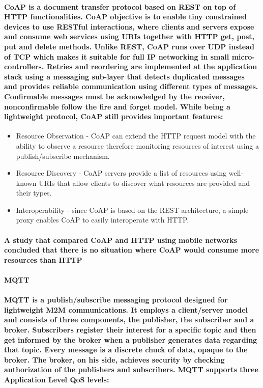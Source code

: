 \paragraph{
	\ac{CoAP} is a document transfer protocol based on \ac{REST} on top of \ac{HTTP} functionalities. \ac{CoAP} objective is to enable tiny constrained devices to use RESTful interactions, where clients and servers expose and consume web services using \ac{URIs} together with  \ac{HTTP} get, post, put and delete methods. Unlike \ac{REST}, \ac{CoAP} runs over \ac{UDP} instead of \ac{TCP} which makes it suitable for full IP networking in small micro-controllers. Retries and reordering are implemented at the application stack using a messaging sub-layer that detects duplicated messages and provides reliable communication using different types of messages. Confirmable messages must be acknowledged by the receiver, nonconfirmable follow the fire and forget model. While being a lightweight protocol, \ac{CoAP} still provides important features:
}
\begin{itemize}
	\item Resource Observation - \ac{CoAP} can extend the \ac{HTTP} request model with the ability to observe a resource therefore monitoring resources of interest using a publish/subscribe mechanism.\\
	\item Resource Discovery - \ac{CoAP} servers provide a list of resources using well-known {URIs} that allow clients to discover what resources are provided and their types.\\
	\item Interoperability - since \ac{CoAP} is based on the \ac{REST} architecture, a simple proxy enables \ac{CoAP} to easily interoperate with \ac{HTTP}.
\end{itemize}

\paragraph{
A study that compared \ac{CoAP} and \ac{HTTP} using mobile networks concluded that there is no situation where \ac{CoAP} would consume more resources than \ac{HTTP} \cite{Savolainen2014}
}

\paragraph{\textbf{\ac{MQTT}}}
\paragraph{
	\ac{MQTT} is a publish/subscribe messaging protocol designed for lightweight \ac{M2M} communications. It employs a client/server model and consists of three components, the publisher, the subscriber and a broker.
Subscribers register their interest for a specific topic and then get informed by the broker when a publisher generates data regarding that topic. Every message is a discrete chuck of data, opaque to the broker. The broker, on his side, achieves security by checking authorization of the publishers and subscribers. \ac{MQTT} supports three Application Level \ac{QoS} levels:
}

